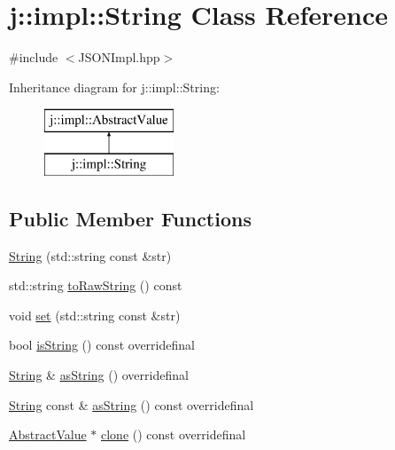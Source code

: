 \hypertarget{classj_1_1impl_1_1_string}{\section{j\-:\-:impl\-:\-:String Class Reference}
\label{classj_1_1impl_1_1_string}
}


{\ttfamily \#include $<$J\-S\-O\-N\-Impl.\-hpp$>$}

Inheritance diagram for j\-:\-:impl\-:\-:String\-:\begin{figure}[H]
\begin{center}
\leavevmode
\includegraphics[height=2.000000cm]{classj_1_1impl_1_1_string}
\end{center}
\end{figure}
\subsection*{Public Member Functions}
\begin{DoxyCompactItemize}
\item 
\hyperlink{classj_1_1impl_1_1_string_a4892fe3f3e362666d1d56eb6ce9b76e7}{String} (std\-::string const \&str)
\item 
std\-::string \hyperlink{classj_1_1impl_1_1_string_aeaa593c84a7cac7074aae01198a68c5a}{to\-Raw\-String} () const 
\item 
void \hyperlink{classj_1_1impl_1_1_string_ab3f3a249161503f7a32853bfb9517d60}{set} (std\-::string const \&str)
\item 
bool \hyperlink{classj_1_1impl_1_1_string_a6ca9214f2d17ebfd0375b4c24e233c89}{is\-String} () const overridefinal
\item 
\hyperlink{classj_1_1impl_1_1_string}{String} \& \hyperlink{classj_1_1impl_1_1_string_a0a9ce87a737e81d5a035fa756d7ecd60}{as\-String} () overridefinal
\item 
\hyperlink{classj_1_1impl_1_1_string}{String} const \& \hyperlink{classj_1_1impl_1_1_string_aaa33cceb60b66372afe727dba5621315}{as\-String} () const overridefinal
\item 
\hyperlink{classj_1_1impl_1_1_abstract_value}{Abstract\-Value} $\ast$ \hyperlink{classj_1_1impl_1_1_string_ac449f19ca6504c13249db0c035444179}{clone} () const overridefinal
\end{DoxyCompactItemize}

